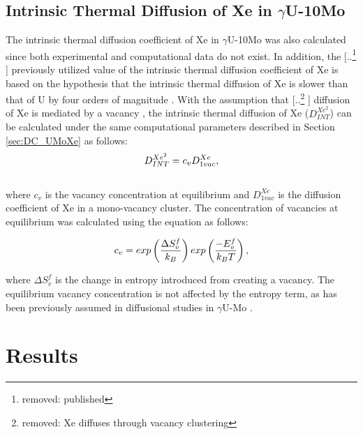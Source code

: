 \documentclass[preprint,12pt]{elsarticle}
\providecommand{\DIFadd}[1]{{\protect\color{blue} \sf #1}} %
\providecommand{\DIFdel}[1]{{\protect\color{red} [..\footnote{removed: #1} ]}} %
\providecommand{\DIFaddbegin}{} %
\providecommand{\DIFaddend}{} %
\providecommand{\DIFdelbegin}{} %
\providecommand{\DIFdelend}{} %
\newcommand{\DIFscaledelfig}{0.5}
\newlength{\DIFdelgraphicswidth} %
\newlength{\DIFdelgraphicsheight} %
\newcommand{\DIFaddincludegraphics}[2][]{{\color{blue}\fbox{\DIFOincludegraphics[#1]{#2}}}} %
\newcommand{\DIFdelincludegraphics}[2][]{%
\sbox{\DIFdelgraphicsbox}{\DIFOincludegraphics[#1]{#2}}%
\settoboxwidth{\DIFdelgraphicswidth}{\DIFdelgraphicsbox} %
\settoboxtotalheight{\DIFdelgraphicsheight}{\DIFdelgraphicsbox} %
\scalebox{\DIFscaledelfig}{%
\parbox[b]{\DIFdelgraphicswidth}{\usebox{\DIFdelgraphicsbox}\\[-\baselineskip] \rule{\DIFdelgraphicswidth}{0em}}\llap{\resizebox{\DIFdelgraphicswidth}{\DIFdelgraphicsheight}{%
\setlength{\unitlength}{\DIFdelgraphicswidth}%
\begin{picture}(1,1)%
\thicklines\linethickness{2pt} %
{\color[rgb]{1,0,0}\put(0,0){\framebox(1,1){}}}%
{\color[rgb]{1,0,0}\put(0,0){\line( 1,1){1}}}%
{\color[rgb]{1,0,0}\put(0,1){\line(1,-1){1}}}%
\end{picture}%
}\hspace*{3pt}}} %
} %
\DeclareRobustCommand{\DIFaddbegin}{\DIFOaddbegin \let\includegraphics\DIFaddincludegraphics} %
\DeclareRobustCommand{\DIFaddend}{\DIFOaddend \let\includegraphics\DIFOincludegraphics} %
\DeclareRobustCommand{\DIFdelbegin}{\DIFOdelbegin \let\includegraphics\DIFdelincludegraphics} %
\DeclareRobustCommand{\DIFdelend}{\DIFOaddend \let\includegraphics\DIFOincludegraphics} %
\begin{document}
\subsection{Intrinsic Thermal Diffusion of Xe in $\gamma$U-10Mo}
The intrinsic thermal diffusion coefficient of Xe in $\gamma$U-10Mo was also calculated since both experimental and computational data do not exist. In addition, the \DIFdelbegin \DIFdel{published }\DIFdelend \DIFaddbegin \DIFadd{previously utilized }\DIFaddend value of the intrinsic thermal diffusion coefficient of Xe is based on the hypothesis that the intrinsic thermal diffusion of Xe is slower than that of U by four orders of magnitude \cite{hu2016formation}. 
With the assumption that \DIFdelbegin \DIFdel{Xe diffuses through vacancy clustering }\DIFdelend \DIFaddbegin \DIFadd{diffusion of Xe is mediated by a vacancy }\DIFaddend \cite{perriot2019atomistic, andersson2019density, andersson2011u, thompson2013pathway, bes2015experimental}, the intrinsic thermal diffusion of Xe ($D^{Xe^{2}}_{INT}$) can be calculated under the same computational parameters described in Section \ref{sec:DC_UMoXe} as follows:
\\
\begin{equation}
D^{Xe^{2}}_{INT} = c_{v}D_{1vac}^{Xe}\DIFaddbegin \DIFadd{,
}\DIFaddend \end{equation}
\\
where $c_{v}$ is the vacancy concentration at equilibrium and $D_{1vac}^{Xe}$ is the diffusion coefficient of Xe in a mono-vacancy cluster. The concentration of vacancies at equilibrium was calculated using the equation as follows:

\begin{equation}
\label{eq:surface}
c_{v}=exp\left({\frac{\Delta S_{v}^{f}}{k_{B}}}\right) exp\left({\frac{-E_{v}^{f}}{k_{B}T}}\right)\DIFaddbegin \DIFadd{,
}\DIFaddend \end{equation}

\noindent where $\Delta S^{f}_{v}$ is the change in entropy introduced from creating a vacancy. The equilibrium vacancy concentration is not affected by the entropy term, as has been previously assumed in diffusional studies in $\gamma$U-Mo \cite{park2021atomistic, smirnova2015investigation}.

\section{Results}
\end{document}
